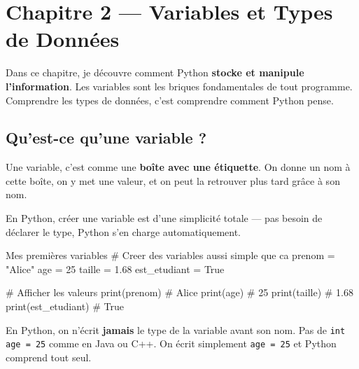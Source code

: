 \documentclass[12pt, a4paper]{article}
\begin{document}
\newpage
\tableofcontents
\newpage


\section*{\faPython\quad Chapitre 2 — Variables et Types de Données}

\vspace{0.3cm}

\begin{boiteRetenir}
Dans ce chapitre, je découvre comment Python \textbf{stocke et manipule l'information}.
Les variables sont les briques fondamentales de tout programme.
Comprendre les types de données, c'est comprendre comment Python pense.
\end{boiteRetenir}

\vspace{0.5cm}

\subsection{Qu'est-ce qu'une variable ?}

Une variable, c'est comme une \textbf{boîte avec une étiquette}. On donne un nom à cette boîte, on y met une valeur, et on peut la retrouver plus tard grâce à son nom.

En Python, créer une variable est d'une simplicité totale — pas besoin de déclarer le type, Python s'en charge automatiquement.

\begin{codeblock}{Mes premières variables}
# Creer des variables aussi simple que ca
prenom = "Alice"
age = 25
taille = 1.68
est_etudiant = True

# Afficher les valeurs
print(prenom)        # Alice
print(age)           # 25
print(taille)        # 1.68
print(est_etudiant)  # True
\end{codeblock}

\begin{boiteNote}
En Python, on n'écrit \textbf{jamais} le type de la variable avant son nom.
Pas de \texttt{int age = 25} comme en Java ou C++.
On écrit simplement \texttt{age = 25} et Python comprend tout seul.
\end{boiteNote}
\end{document}
